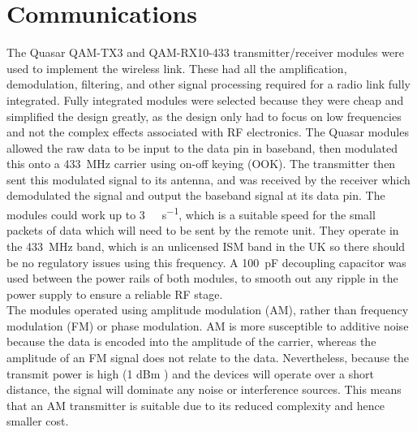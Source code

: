 \section{Communications}

The Quasar QAM-TX3 \cite{qam-tx} and QAM-RX10-433 \cite{qam-rx} transmitter/receiver modules were used to implement the wireless link. These had all the amplification, demodulation, filtering, and other signal processing required for a radio link fully integrated. Fully integrated modules were selected because they were cheap and simplified the design greatly, as the design only had to focus on low frequencies and not the complex effects associated with RF electronics. The Quasar modules allowed the raw data to be input to the data pin in baseband, then modulated this onto a \SI{433}{\mega\hertz} carrier using on-off keying (OOK). The transmitter then sent this modulated signal to its antenna, and was received by the receiver which demodulated the signal and output the baseband signal at its data pin. The modules could work up to \SI{3}{\kilo\bit\per\second}, which is a suitable speed for the small packets of data which will need to be sent by the remote unit. They operate in the \SI{433}{\mega\hertz} band, which is an unlicensed ISM band in the UK \cite{ism_band} so there should be no regulatory issues using this frequency. A \SI{100}{\pico\farad} decoupling capacitor was used between the power rails of both modules, to smooth out any ripple in the power supply to ensure a reliable RF stage.\\

The modules operated using amplitude modulation (AM), rather than frequency modulation (FM) or phase modulation. AM is more susceptible to additive noise because the data is encoded into the amplitude of the carrier, whereas the amplitude of an FM signal does not relate to the data. Nevertheless, because the transmit power is high (1 dBm \cite{qam-tx}) and the devices will operate over a short distance, the signal will dominate any noise or interference sources. This means that an AM transmitter is suitable due to its reduced complexity and hence smaller cost.\\

